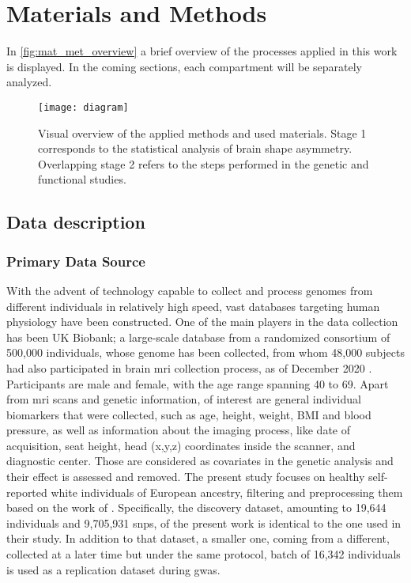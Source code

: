 \chapter{Materials and Methods}\label{chap:mat_and_methods}
In \autoref{fig:mat_met_overview} a brief overview of the processes applied in this work is displayed. In the coming sections, each compartment will be separately analyzed.

\begin{figure}[H]
	\centering
	\texttt{[image: diagram]}
	\caption[Visual overview of methods and materials]{Visual overview of the applied methods and used materials. Stage 1 corresponds to the statistical analysis of brain shape asymmetry. Overlapping stage 2 refers to the steps performed in the genetic and functional studies.}
	\label{fig:mat_met_overview}
\end{figure}


\section{Data description}
\subsection{Primary Data Source}
\label{subsec:primary_data_source}
With the advent of technology capable to collect and process genomes from different individuals in relatively high speed, vast databases targeting human physiology have been constructed. One of the main players in the data collection has been UK Biobank; a large-scale database from a randomized consortium of 500,000 individuals, whose genome has been collected, from whom  48,000 subjects had also participated in brain \ac{mri} collection process, as of December 2020 \cite{Littlejohns2020}. Participants are male and female, with the age range spanning 40 to 69. Apart from \ac{mri} scans and genetic information, of interest are general individual biomarkers that were collected, such as age, height, weight, BMI and blood pressure, as well as information about the imaging process, like date of acquisition, seat height, head (x,y,z) coordinates inside the scanner, and diagnostic center. Those are considered as covariates in the genetic analysis and their effect is assessed and removed. The present study focuses on healthy self-reported white individuals of European ancestry, filtering and preprocessing them based on the work of \citet{Naqvi2021}. Specifically, the discovery dataset, amounting to 19,644 individuals and 9,705,931 \acp{snp}, of the present work is identical to the one used in their study. In addition to that dataset, a smaller one, coming from a different, collected at a later time but under the same protocol, batch of 16,342 individuals is used as a replication dataset during \ac{gwas}.

